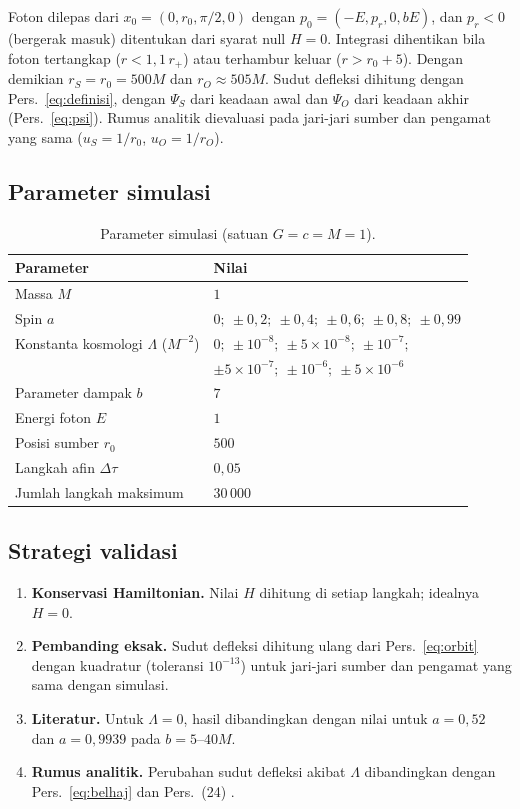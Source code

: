 \documentclass[11pt,a4paper]{article}
\begin{document}
Foton dilepas dari $x_0 = (0, r_0, \pi/2, 0)$ dengan $p_0 = (-E, p_r, 0, bE)$, dan $p_r < 0$ (bergerak masuk)
ditentukan dari syarat null $H = 0$. Integrasi dihentikan bila foton tertangkap ($r < 1{,}1\,r_+$) atau
terhambur keluar ($r > r_0 + 5$). Dengan demikian $r_S = r_0 = 500M$ dan $r_O \approx 505M$. Sudut defleksi
dihitung dengan Pers.~\eqref{eq:definisi}, dengan $\Psi_S$ dari keadaan awal dan $\Psi_O$ dari keadaan akhir
(Pers.~\eqref{eq:psi}). Rumus analitik dievaluasi pada jari-jari sumber dan pengamat yang sama
($u_S = 1/r_0$, $u_O = 1/r_O$).

\subsection{Parameter simulasi}

\begin{table}[h]
  \centering
  \caption{Parameter simulasi (satuan $G = c = M = 1$).}
  \label{tab:parameter}
  \begin{tabular}{ll}
    \toprule
    Parameter & Nilai \\
    \midrule
    Massa $M$ & $1$ \\
    Spin $a$ & $0;\ \pm0{,}2;\ \pm0{,}4;\ \pm0{,}6;\ \pm0{,}8;\ \pm0{,}99$ \\
    Konstanta kosmologi $\Lambda$ ($M^{-2}$) & $0;\ \pm10^{-8};\ \pm5\times10^{-8};\ \pm10^{-7};$ \\
     & $\pm5\times10^{-7};\ \pm10^{-6};\ \pm5\times10^{-6}$ \\
    Parameter dampak $b$ & $7$ \\
    Energi foton $E$ & $1$ \\
    Posisi sumber $r_0$ & $500$ \\
    Langkah afin $\Delta\tau$ & $0{,}05$ \\
    Jumlah langkah maksimum & $30\,000$ \\
    \bottomrule
  \end{tabular}
\end{table}

\subsection{Strategi validasi}

\begin{enumerate}
  \item \textbf{Konservasi Hamiltonian.} Nilai $H$ dihitung di setiap langkah; idealnya $H = 0$.
  \item \textbf{Pembanding eksak.} Sudut defleksi dihitung ulang dari Pers.~\eqref{eq:orbit} dengan
        kuadratur (toleransi $10^{-13}$) untuk jari-jari sumber dan pengamat yang sama dengan simulasi.
  \item \textbf{Literatur.} Untuk $\Lambda = 0$, hasil dibandingkan dengan nilai
        \citet{hasanuddin2012pembelokan} untuk $a = 0{,}52$ dan $a = 0{,}9939$ pada $b = 5$--$40M$.
  \item \textbf{Rumus analitik.} Perubahan sudut defleksi akibat $\Lambda$ dibandingkan dengan
        Pers.~\eqref{eq:belhaj} dan Pers.~(24) \citet{huang2025influence}.
\end{enumerate}
\end{document}
